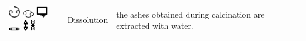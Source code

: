 \documentclass[british,final,landscape]{scrartcl}
\begin{document}
\begin{refsection}
\begin{supertabular}{p{0.3\textwidth}p{0.34\textwidth}p{0.34\textwidth}}
   \includegraphics[width=5mm]{Process/Dissolution} \includegraphics[width=5mm]{Process/Dissolution2} \includegraphics[width=5mm]{Process/Dissolution3} \includegraphics[width=5mm]{Process/Dissolution4} \includegraphics[height=5mm]{Process/Dissolution5} \includegraphics[height=5mm]{Process/Dissolution6} & Dissolution & the ashes obtained during calcination are extracted with water. \\

\end{supertabular}
\end{refsection}
\end{document}
